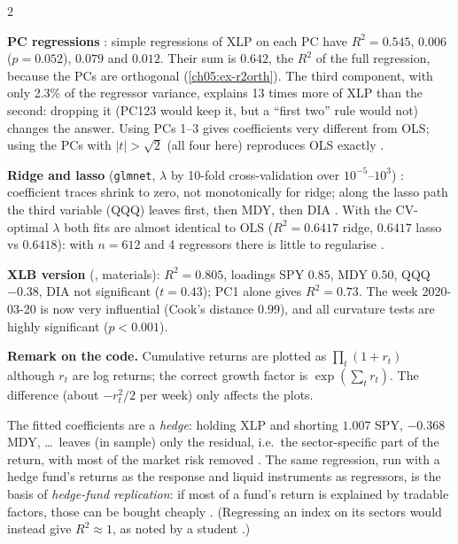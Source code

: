 \begin{paracol}{2}
\begin{casestudy}[ETF case study (\file{lec06_4} = \file{ETF_Casestudy.pdf}, sector XLP)]
\textbf{PC regressions} : simple regressions of XLP on each PC have $R^2=0.545$, $0.006$ ($p=0.052$),
$0.079$ and $0.012$. Their sum is $0.642$, the $R^2$ of the full regression, because the PCs are orthogonal
(\cref{ch05:ex-r2orth}). The third component, with only 2.3\% of the regressor variance, explains 13 times more of
XLP than the second: dropping it (PC123 would keep it, but a ``first two'' rule would not) changes the answer. Using PCs 1--3
gives coefficients very different from OLS; using the PCs with $|t|>\sqrt2$ (all four here) reproduces OLS exactly
.

\textbf{Ridge and lasso} (\texttt{glmnet}, $\lambda$ by 10-fold cross-validation over $10^{-5}$--$10^{3}$)
: coefficient traces shrink to zero, not monotonically for ridge; along the lasso path the third
variable (QQQ) leaves first, then MDY, then DIA . With the CV-optimal $\lambda$ both fits are
almost identical to OLS ($R^2=0.6417$ ridge, $0.6417$ lasso vs $0.6418$): with $n=612$ and 4 regressors there is little
to regularise .

\textbf{XLB version} (, materials): $R^2=0.805$, loadings SPY $0.85$, MDY $0.50$, QQQ
$-0.38$, DIA not significant ($t=0.43$); PC1 alone gives $R^2=0.73$. The week 2020-03-20 is now very influential (Cook's
distance $0.99$), and all curvature tests are highly significant ($p<0.001$).

\textbf{Remark on the code.} Cumulative returns are plotted as $\prod_t(1+r_t)$ although $r_t$ are log returns; the correct
growth factor is $\exp(\sum_tr_t)$. The difference (about $-r_t^2/2$ per week) only affects the plots.
\end{casestudy}

\begin{finance}
The fitted coefficients are a \emph{hedge}: holding XLP and shorting $1.007$ SPY, $-0.368$ MDY, \dots\ leaves (in
sample) only the residual, i.e.\ the sector-specific part of the return, with most of the market risk removed
. The same regression, run with a hedge fund's returns as the response and liquid instruments as
regressors, is the basis of \emph{hedge-fund replication}: if most of a fund's return is explained by tradable factors,
those can be bought cheaply . (Regressing an index on its sectors would instead give $R^2\approx1$, as
noted by a student .)
\end{finance}


\end{paracol}
